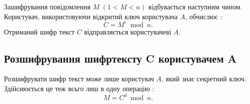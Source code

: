 Зашифрування повідомлення $M \; (1<M<n)$ відбувається наступним чином. Користувач, використовуючи відкритий ключ користувача $A$, обчислює : 
\begin{equation}
C = M^e \bmod n.
\end{equation}
Отриманий шифр текст $C$ відправляється користувачеві $A$.

\subsection{Розшифрування шифртексту C користувачем A}

Розшифрувати шифр текст може лише користувач $A$, який знає секретний ключ. Здійснюється це теж всьго лиш в одну операцію : 
\begin{equation} \label{eq:3.2} 
M = C ^ d \bmod n.
\end{equation}

